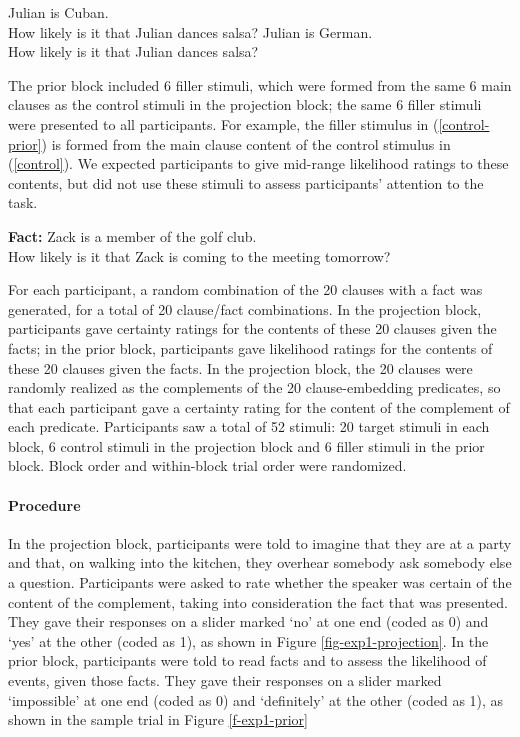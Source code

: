 \documentclass[11pt,fleqn]{article}
\newcommand{\6}{\mbox{$[\hspace*{-.6mm}[$}}
\newcommand{\9}{\mbox{$]\hspace*{-.6mm}]$}}
\begin{document}
\begin{exe}
\ex\label{target} 
\begin{xlist}
 Julian is Cuban. \\ How likely is it that Julian dances salsa?
 Julian is German. \\ How likely is it that Julian dances salsa?
\end{xlist}
\end{exe}
The prior block included 6 filler stimuli, which were formed from the same 6 main clauses as the control stimuli in the projection block; the same 6 filler stimuli were presented to all participants. For example, the filler stimulus in (\ref{control-prior}) is formed from the main clause content of the control stimulus in (\ref{control}). We expected participants to give mid-range likelihood ratings to these contents, but did not use these stimuli to assess participants' attention to the task.

\begin{exe}
\ex\label{control-prior} {\bf Fact:}  Zack is a member of the golf club. \\ How likely is it that Zack is coming to the meeting tomorrow?
\end{exe}

For each participant, a random combination of the 20 clauses with a fact was generated, for a total of 20 clause/fact combinations. In the projection block, participants gave certainty ratings for the contents of these 20 clauses given the facts; in the prior block, participants gave likelihood ratings for the contents of these 20 clauses given the facts. In the projection block, the 20 clauses were randomly realized as the complements of the 20 clause-embedding predicates, so that each participant gave a certainty rating for the content of the complement of each predicate. Participants saw a total of 52 stimuli: 20 target stimuli in each block, 6 control stimuli in the projection block and 6 filler stimuli in the prior block. Block order and within-block trial order were randomized.

\paragraph{Procedure} In the projection block, participants were told to imagine that they are at a party and that, on walking into the kitchen, they overhear somebody ask somebody else a question. Participants were asked to rate whether the speaker was certain of the content of the complement, taking into consideration the fact that was presented. They gave their responses on a slider marked `no' at one end (coded as 0) and `yes' at the other (coded as 1), as shown in Figure \ref{fig-exp1-projection}. In the prior block, participants were told to read facts and to assess the likelihood of events, given those facts. They gave their responses on a slider marked `impossible' at one end (coded as 0) and `definitely' at the other (coded as 1), as shown in the sample trial in Figure \ref{f-exp1-prior}
\end{document}
